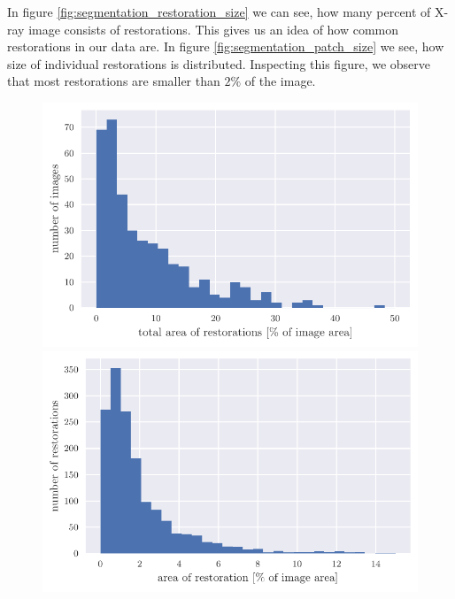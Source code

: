 In figure \ref{fig:segmentation_restoration_size} we can see, how many percent of X-ray image consists of restorations. This gives us an idea of how common restorations in our data are. In figure \ref{fig:segmentation_patch_size} we see, how size of individual restorations is distributed. Inspecting this figure, we observe that most restorations are smaller than $2\%$ of the image.

\begin{figure}
    \centering
    \begin{floatrow}[2]
        {\includegraphics[width=\linewidth]{images/histogram_of_restoration_size.pdf}}\;
        {\includegraphics[width=\linewidth]{images/histogram_of_patch_size.pdf}}
    \end{floatrow}
\end{figure}